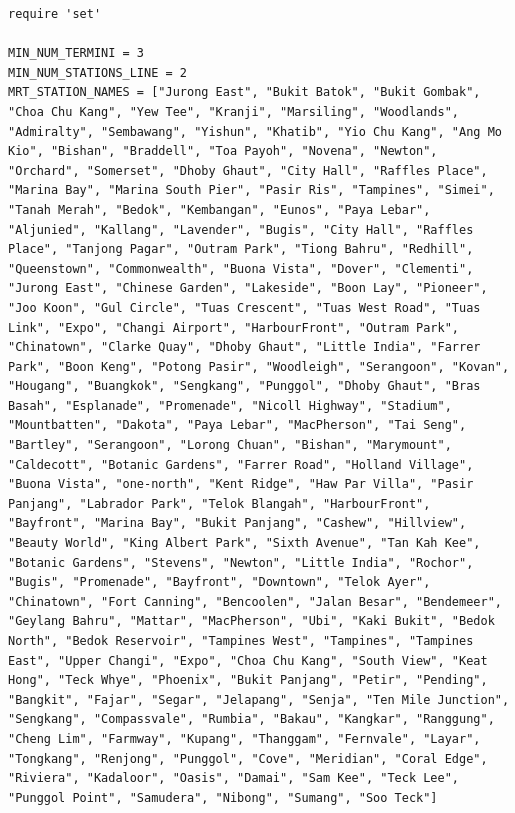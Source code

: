 \documentclass[a4paper,12pt]{article}
\begin{document}
\begin{verbatim}
require 'set'

MIN_NUM_TERMINI = 3
MIN_NUM_STATIONS_LINE = 2
MRT_STATION_NAMES = ["Jurong East", "Bukit Batok", "Bukit Gombak", "Choa Chu Kang", "Yew Tee", "Kranji", "Marsiling", "Woodlands", "Admiralty", "Sembawang", "Yishun", "Khatib", "Yio Chu Kang", "Ang Mo Kio", "Bishan", "Braddell", "Toa Payoh", "Novena", "Newton", "Orchard", "Somerset", "Dhoby Ghaut", "City Hall", "Raffles Place", "Marina Bay", "Marina South Pier", "Pasir Ris", "Tampines", "Simei", "Tanah Merah", "Bedok", "Kembangan", "Eunos", "Paya Lebar", "Aljunied", "Kallang", "Lavender", "Bugis", "City Hall", "Raffles Place", "Tanjong Pagar", "Outram Park", "Tiong Bahru", "Redhill", "Queenstown", "Commonwealth", "Buona Vista", "Dover", "Clementi", "Jurong East", "Chinese Garden", "Lakeside", "Boon Lay", "Pioneer", "Joo Koon", "Gul Circle", "Tuas Crescent", "Tuas West Road", "Tuas Link", "Expo", "Changi Airport", "HarbourFront", "Outram Park", "Chinatown", "Clarke Quay", "Dhoby Ghaut", "Little India", "Farrer Park", "Boon Keng", "Potong Pasir", "Woodleigh", "Serangoon", "Kovan", "Hougang", "Buangkok", "Sengkang", "Punggol", "Dhoby Ghaut", "Bras Basah", "Esplanade", "Promenade", "Nicoll Highway", "Stadium", "Mountbatten", "Dakota", "Paya Lebar", "MacPherson", "Tai Seng", "Bartley", "Serangoon", "Lorong Chuan", "Bishan", "Marymount", "Caldecott", "Botanic Gardens", "Farrer Road", "Holland Village", "Buona Vista", "one-north", "Kent Ridge", "Haw Par Villa", "Pasir Panjang", "Labrador Park", "Telok Blangah", "HarbourFront", "Bayfront", "Marina Bay", "Bukit Panjang", "Cashew", "Hillview", "Beauty World", "King Albert Park", "Sixth Avenue", "Tan Kah Kee", "Botanic Gardens", "Stevens", "Newton", "Little India", "Rochor", "Bugis", "Promenade", "Bayfront", "Downtown", "Telok Ayer", "Chinatown", "Fort Canning", "Bencoolen", "Jalan Besar", "Bendemeer", "Geylang Bahru", "Mattar", "MacPherson", "Ubi", "Kaki Bukit", "Bedok North", "Bedok Reservoir", "Tampines West", "Tampines", "Tampines East", "Upper Changi", "Expo", "Choa Chu Kang", "South View", "Keat Hong", "Teck Whye", "Phoenix", "Bukit Panjang", "Petir", "Pending", "Bangkit", "Fajar", "Segar", "Jelapang", "Senja", "Ten Mile Junction", "Sengkang", "Compassvale", "Rumbia", "Bakau", "Kangkar", "Ranggung", "Cheng Lim", "Farmway", "Kupang", "Thanggam", "Fernvale", "Layar", "Tongkang", "Renjong", "Punggol", "Cove", "Meridian", "Coral Edge", "Riviera", "Kadaloor", "Oasis", "Damai", "Sam Kee", "Teck Lee", "Punggol Point", "Samudera", "Nibong", "Sumang", "Soo Teck"]


\end{verbatim}
\end{document}
